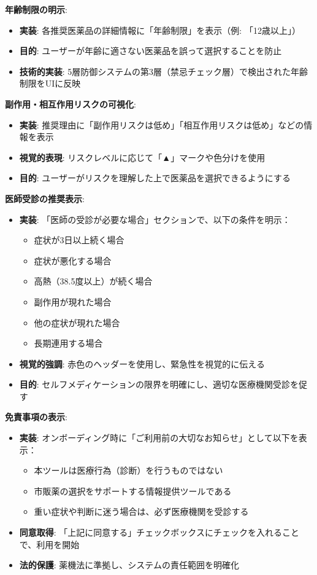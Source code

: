 \documentclass[a4paper,11pt,ja=standard,xelatex]{bxjsarticle}
\theoremstyle{definition}
\begin{document}
\textbf{年齢制限の明示}:
\begin{itemize}
\item \textbf{実装}: 各推奨医薬品の詳細情報に「年齢制限」を表示（例: 「12歳以上」）
\item \textbf{目的}: ユーザーが年齢に適さない医薬品を誤って選択することを防止
\item \textbf{技術的実装}: 5層防御システムの第3層（禁忌チェック層）で検出された年齢制限をUIに反映
\end{itemize}

\textbf{副作用・相互作用リスクの可視化}:
\begin{itemize}
\item \textbf{実装}: 推奨理由に「副作用リスクは低め」「相互作用リスクは低め」などの情報を表示
\item \textbf{視覚的表現}: リスクレベルに応じて「▲」マークや色分けを使用
\item \textbf{目的}: ユーザーがリスクを理解した上で医薬品を選択できるようにする
\end{itemize}

\textbf{医師受診の推奨表示}:
\begin{itemize}
\item \textbf{実装}: 「医師の受診が必要な場合」セクションで、以下の条件を明示：
  \begin{itemize}
  \item 症状が3日以上続く場合
  \item 症状が悪化する場合
  \item 高熱（38.5度以上）が続く場合
  \item 副作用が現れた場合
  \item 他の症状が現れた場合
  \item 長期連用する場合
  \end{itemize}
\item \textbf{視覚的強調}: 赤色のヘッダーを使用し、緊急性を視覚的に伝える
\item \textbf{目的}: セルフメディケーションの限界を明確にし、適切な医療機関受診を促す
\end{itemize}

\textbf{免責事項の表示}:
\begin{itemize}
\item \textbf{実装}: オンボーディング時に「ご利用前の大切なお知らせ」として以下を表示：
  \begin{itemize}
  \item 本ツールは医療行為（診断）を行うものではない
  \item 市販薬の選択をサポートする情報提供ツールである
  \item 重い症状や判断に迷う場合は、必ず医療機関を受診する
  \end{itemize}
\item \textbf{同意取得}: 「上記に同意する」チェックボックスにチェックを入れることで、利用を開始
\item \textbf{法的保護}: 薬機法に準拠し、システムの責任範囲を明確化
\end{itemize}
\end{document}
